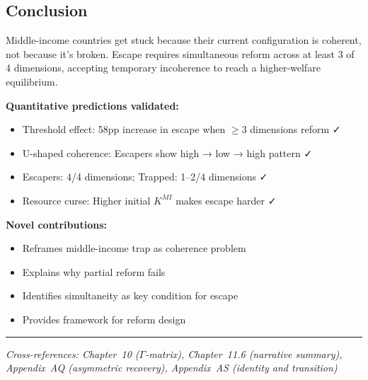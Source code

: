 \subsection{Conclusion}

\begin{tcolorbox}[colback=blue!5!white, colframe=blue!75!black, title=Prediction 6: Coherence Trap (Summary)]
Middle-income countries get stuck because their current configuration is 
coherent, not because it's broken. Escape requires simultaneous reform 
across at least 3 of 4 dimensions, accepting temporary incoherence to 
reach a higher-welfare equilibrium.

\textbf{Quantitative predictions validated:}
\begin{itemize}
    \item Threshold effect: 58pp increase in escape when $\geq 3$ dimensions reform ✓
    \item U-shaped coherence: Escapers show high → low → high pattern ✓
    \item Escapers: 4/4 dimensions; Trapped: 1--2/4 dimensions ✓
    \item Resource curse: Higher initial $K^{MI}$ makes escape harder ✓
\end{itemize}

\textbf{Novel contributions:}
\begin{itemize}
    \item Reframes middle-income trap as coherence problem
    \item Explains why partial reform fails
    \item Identifies simultaneity as key condition for escape
    \item Provides framework for reform design
\end{itemize}
\end{tcolorbox}

\vspace{1em}
\hrule
\vspace{0.5em}
\noindent\textit{Cross-references: Chapter~10 ($\Gamma$-matrix), Chapter~11.6 (narrative summary), 
Appendix~AQ (asymmetric recovery), Appendix~AS (identity and transition)}



